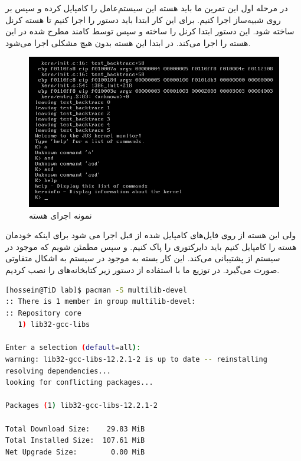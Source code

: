 \documentclass[a4paper, 12pt]{article}
\title{\lr{JOS Execution Environment}}
\author{
    علی کریمی \and
    حسین افکار \and
    محمدرضا ولی
    }
\begin{document}
\maketitle
در مرحله اول این تمرین ما باید هسته این سیستم‌عامل را کامپایل کرده و سپس بر روی شبیه‌ساز
اجرا کنیم.
برای این کار ابتدا باید دستور
را اجرا کنیم تا هسته کرنل ساخته شود.
این دستور ابتدا کرنل را ساخته و سپس توسط کامند مطرح شده در
این هسته را اجرا می‌کند.
در ابتدا این هسته بدون هیچ مشکلی اجرا می‌شود.
\begin{figure}[H]
    \centering
    \includegraphics[width=1.0\textwidth]{1.png}
    \caption{نمونه اجرای هسته
    }
    \label{fig1:output}
\end{figure}
ولی این هسته از روی فایل‌های کامپایل شده از قبل اجرا می شود برای اینکه خودمان هسته را کامپایل کنیم
باید دایرکتوری
را پاک کنیم.
و سپس مطمئن شویم که
موجود در سیستم از
پشتیبانی می‌کند.
این کار بسته به
موجود در سیستم به اشکال متفاوتی صورت می‌گیرد.
در توزیع
ما با استفاده از دستور زیر کتابخانه‌های
را نصب کردیم. \pagebreak
\begin{latin}
\begin{lstlisting}[language=bash]
[hossein@TiD lab]$ pacman -S multilib-devel
:: There is 1 member in group multilib-devel:
:: Repository core
   1) lib32-gcc-libs

Enter a selection (default=all):
warning: lib32-gcc-libs-12.2.1-2 is up to date -- reinstalling
resolving dependencies...
looking for conflicting packages...

Packages (1) lib32-gcc-libs-12.2.1-2

Total Download Size:    29.83 MiB
Total Installed Size:  107.61 MiB
Net Upgrade Size:        0.00 MiB
\end{lstlisting}
\end{latin}
\end{document}
